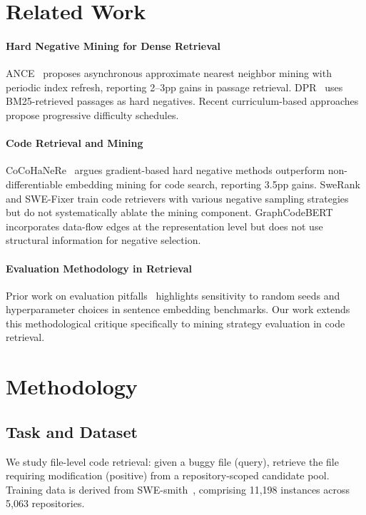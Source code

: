 \documentclass[11pt,a4paper]{article}
\begin{document}
\section{Related Work}

\paragraph{Hard Negative Mining for Dense Retrieval}
ANCE~\cite{xiong2021approximate} proposes asynchronous approximate nearest neighbor mining with periodic index refresh, reporting 2--3pp gains in passage retrieval.
DPR~\cite{karpukhin2020dense} uses BM25-retrieved passages as hard negatives.
Recent curriculum-based approaches~\cite{robinson2021contrastive} propose progressive difficulty schedules.

\paragraph{Code Retrieval and Mining}
CoCoHaNeRe~\cite{cocohanere2025} argues gradient-based hard negative methods outperform non-differentiable embedding mining for code search, reporting 3.5pp gains.
SweRank~\cite{jimenez2024swerank} and SWE-Fixer train code retrievers with various negative sampling strategies but do not systematically ablate the mining component.
GraphCodeBERT~\cite{guo2021graphcodebert} incorporates data-flow edges at the representation level but does not use structural information for negative selection.

\paragraph{Evaluation Methodology in Retrieval}
Prior work on evaluation pitfalls~\cite{reimers2019sentence} highlights sensitivity to random seeds and hyperparameter choices in sentence embedding benchmarks.
Our work extends this methodological critique specifically to mining strategy evaluation in code retrieval.

\section{Methodology}

\subsection{Task and Dataset}

We study file-level code retrieval: given a buggy file (query), retrieve the file requiring modification (positive) from a repository-scoped candidate pool.
Training data is derived from SWE-smith~\cite{jimenez2024swesmith}, comprising 11,198 instances across 5,063 repositories.
\end{document}
